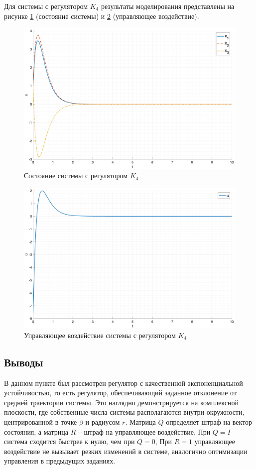 Для системы с регулятором $K_4$ результаты моделирования представлены на рисунке \ref{fig:task3_4_x} 
(состояние системы) и \ref{fig:task3_4_u} (управляющее воздействие).
\begin{figure}[ht!]
    \centering
    \includegraphics[width=\textwidth]{media/plots/task3_4_x.png}
    \caption{Состояние системы с регулятором $K_4$}
    \label{fig:task3_4_x}
\end{figure}

\begin{figure}[ht!]
    \centering
    \includegraphics[width=\textwidth]{media/plots/task3_4_u.png}
    \caption{Управляющее воздействие системы с регулятором $K_4$}
    \label{fig:task3_4_u}
\end{figure}

\FloatBarrier
\subsection{Выводы}
В данном пункте был рассмотрен регулятор с качественной экспоненциальной устойчивостью, 
то есть регулятор, обеспечивающий заданное отклонение от средней траектории системы. Это наглядно 
демонстрируется на комплексной плоскости, где собственные числа системы располагаются внутри окружности,
центрированной в точке $\beta$ и радиусом $r$.
Матрица $Q$ определяет штраф на вектор состояния, а матрица $R$ -- штраф на управляющее воздействие.
При $Q = I$ система сходится быстрее к нулю, чем при $Q = 0$, 
При $R = 1$ управляющее воздействие не вызывает резких изменений в системе, аналогично 
оптимизации управления в предыдущих заданиях. 